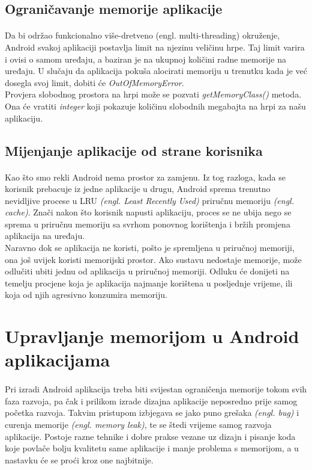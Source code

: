 \documentclass[times, utf8, zavrsni]{fer}
\begin{document}
\subsection{Ograničavanje memorije aplikacije}
\paragraph{}
Da bi održao funkcionalno više-dretveno (engl. multi-threading) okruženje, Android svakoj aplikaciji postavlja limit na njezinu veličinu hrpe. Taj limit varira i ovisi o samom uređaju, a baziran je na ukupnoj količini radne memorije na uređaju. U slučaju da aplikacija pokuša alocirati memoriju u trenutku kada je već dosegla svoj limit, dobiti će \textit{OutOfMemoryError}.\\

Provjera slobodnog prostora na hrpi može se pozvati \textit{getMemoryClass()} metoda. Ona će vratiti \textit{integer} koji pokazuje količinu slobodnih megabajta na hrpi za našu aplikaciju.

\subsection{Mijenjanje aplikacije od strane korisnika}
\paragraph{}
Kao što smo rekli Android nema prostor za zamjenu. Iz tog razloga, kada se korisnik prebacuje iz jedne aplikacije u drugu, Android sprema trenutno nevidljive procese u LRU \textit{(engl. Least Recently Used)} priručnu memoriju \textit{(engl. cache)}. Znači nakon što korisnik napusti aplikaciju, proces se ne ubija nego se sprema u priručnu memoriju sa svrhom ponovnog korištenja i bržih promjena aplikacija na uređaju.\\

Naravno dok se aplikacija ne koristi, pošto je spremljena u priručnoj memoriji, ona još uvijek koristi memorijski prostor. Ako sustavu nedostaje memorije, može odlučiti ubiti jednu od aplikacija u priručnoj memoriji. Odluku će donijeti na temelju procjene koja je aplikacija najmanje korištena u posljednje vrijeme, ili  koja od njih agresivno konzumira memoriju.

\pagebreak
\section{Upravljanje memorijom u Android aplikacijama}
\paragraph{}
Pri izradi Android aplikacija treba biti svijestan ograničenja memorije tokom svih faza razvoja, pa čak i prilikom izrade dizajna aplikacije neposredno prije samog početka razvoja. Takvim pristupom izbjegava se jako puno grešaka \textit{(engl. bug)} i curenja memorije \textit{(engl. memory leak)}, te se štedi vrijeme samog razvoja aplikacije. Postoje razne tehnike i dobre prakse vezane uz dizajn i pisanje koda koje povlače bolju kvalitetu same aplikacije i manje problema s memorijom, a u nastavku će se proći kroz one najbitnije.
\end{document}
